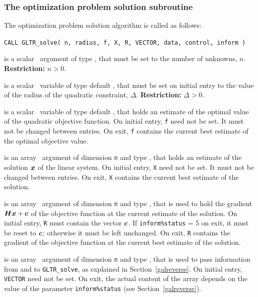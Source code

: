 \documentclass{galahad}
\newcommand{\packagename}{GL\-TR}
\begin{document}

\subsubsection{The optimization problem solution subroutine}
The optimization problem solution algorithm is called as follows:

\hskip0.5in
{\tt CALL \packagename\_solve( n, radius, f, X, R, VECTOR, data, control, inform )}

\begin{description}

 is a scalar \intentin\ argument of type \integer, that must be
set to the number of unknowns, $n$. {\bf Restriction: } $n  >  0$.

 is a scalar \intentin\ variable of type default
\realdp,
that must be set on initial entry
to the value of the radius of the quadratic constraint, $\Delta$.
{\bf Restriction: } $\Delta > 0$.

 is a scalar \intentinout\ variable of type default
\realdp,
that holds an estimate of
the optimal value of the quadratic objective function.
On initial entry, {\tt f} need not be set.
It must not be changed between entries.
On exit, {\tt f} contains the current best estimate of the optimal objective
value.

 is an array \intentinout\ argument of dimension {\tt n} and
type \realdp,
that holds an estimate of the solution ${\bm{x}}$ of the linear system.
On initial entry, {\tt X} need not be set.
It must not be changed between entries.
On exit, {\tt X} contains the current best estimate of the solution.

 is an array \intentinout\ argument of dimension {\tt n} and
type \realdp,
that is used to hold the gradient ${\bm{H}} {\bm{x}}  +  {\bm{c}}$ of the objective
function at the current estimate of the solution.
On initial entry, {\tt R} must contain the vector ${\bm{c}}$.
If {\tt inform\%status} = 5 on exit, it must be reset to  ${\bm{c}}$; otherwise
it must be left unchanged. On exit, {\tt R} contains the gradient of the objective
function at the current best estimate of the solution.

 is an array \intentinout\ argument of dimension {\tt n}
and type \realdp,
that is used to pass information from and to {\tt \packagename\_solve},
as explained in Section~\ref{galreverse}.
On initial entry, {\tt VECTOR} need not be set. On exit, the actual content of
the array depends on the value of the parameter {\tt inform\%status}
(see Section~\ref{galreverse}).


\end{description}
\end{document}
